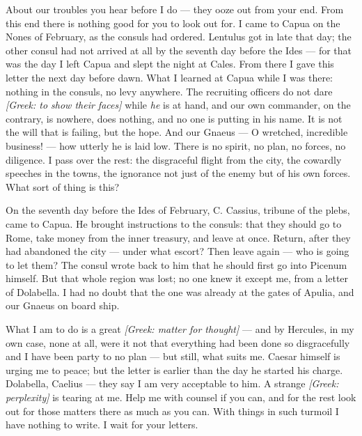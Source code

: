 

 About our troubles you hear before I do --- they ooze out from your end. From this end there is nothing good for you to look out for. I came to Capua on the Nones of February, as the consuls had ordered. Lentulus got in late that day; the other consul had not arrived at all by the seventh day before the Ides --- for that was the day I left Capua and slept the night at Cales. From there I gave this letter the next day before dawn. What I learned at Capua while I was there: nothing in the consuls, no levy anywhere. The recruiting officers do not dare \textit{[Greek: to show their faces]} while \emph{he} is at hand, and our own commander, on the contrary, is nowhere, does nothing, and no one is putting in his name. It is not the will that is failing, but the hope. And our Gnaeus --- O wretched, incredible business! --- how utterly he is laid low. There is no spirit, no plan, no forces, no diligence. I pass over the rest: the disgraceful flight from the city, the cowardly speeches in the towns, the ignorance not just of the enemy but of his own forces. What sort of thing is this?

 On the seventh day before the Ides of February, C. Cassius, tribune of the plebs, came to Capua. He brought instructions to the consuls: that they should go to Rome, take money from the inner treasury, and leave at once. Return, after they had abandoned the city --- under what escort? Then leave again --- who is going to let them? The consul wrote back to him that he should first go into Picenum himself. But that whole region was lost; no one knew it except me, from a letter of Dolabella. I had no doubt that the one was already at the gates of Apulia, and our Gnaeus on board ship.

 What I am to do is a great \textit{[Greek: matter for thought]} --- and by Hercules, in my own case, none at all, were it not that everything had been done so disgracefully and I have been party to no plan --- but still, what suits me. Caesar himself is urging me to peace; but the letter is earlier than the day he started his charge. Dolabella, Caelius --- they say I am very acceptable to him. A strange \textit{[Greek: perplexity]} is tearing at me. Help me with counsel if you can, and for the rest look out for those matters there as much as you can. With things in such turmoil I have nothing to write. I wait for your letters.
